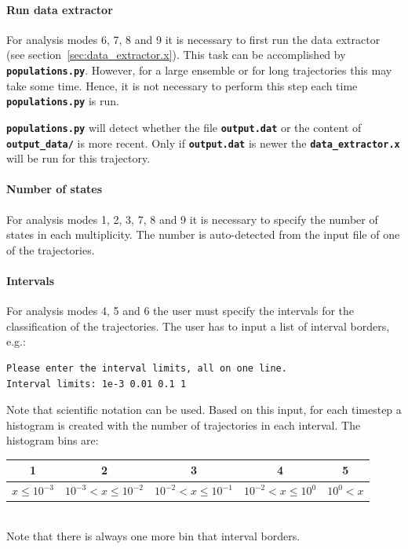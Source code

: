 \documentclass[a4paper,11pt,DIV=15,openany,twoside=false]{scrbook}
\newcommand{\ttt}[1]{\textbf{\texttt{#1}}}
\begin{document}
\paragraph{Run data extractor}

For analysis modes 6, 7, 8 and 9 it is necessary to first run the data extractor (see section~\ref{sec:data_extractor.x}). This task can be accomplished by \ttt{populations.py}. However, for a large ensemble or for long trajectories this may take some time. Hence, it is not necessary to perform this step each time \ttt{populations.py} is run. 

\ttt{populations.py} will detect whether the file \ttt{output.dat} or the content of \ttt{output\_data/} is more recent. Only if \ttt{output.dat} is newer the \ttt{data\_extractor.x} will be run for this trajectory.

\paragraph{Number of states}

For analysis modes 1, 2, 3, 7, 8 and 9 it is necessary to specify the number of states in each multiplicity. The number is auto-detected from the input file of one of the trajectories.

\paragraph{Intervals}

For analysis modes 4, 5 and 6 the user must specify the intervals for the classification of the trajectories. The user has to input a list of interval borders, e.g.:
\begin{verbatim}
Please enter the interval limits, all on one line.
Interval limits: 1e-3 0.01 0.1 1
\end{verbatim}
Note that scientific notation can be used. Based on this input, for each timestep a histogram is created with the number of trajectories in each interval. The histogram bins are:

\begin{tabular}{ccccc}
  \toprule
  1&2&3&4&5\\
  \midrule
  $x\leq10^{-3}$     &$10^{-3}<x\leq10^{-2}$ &$10^{-2}<x\leq10^{-1}$ &$10^{-2}<x\leq10^{0}$ &$10^{0}<x$\\
  \bottomrule
\end{tabular}\\
Note that there is always one more bin that interval borders.
\end{document}
